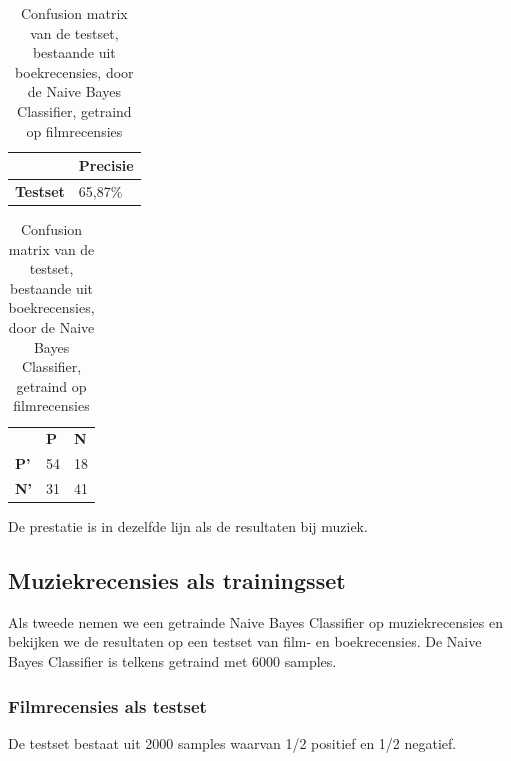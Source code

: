 \begin{table}[h]
\centering
\setlength\tabcolsep{4pt}
\begin{minipage}[t]{0.48\textwidth}
\centering
\begin{tabular}{l|l|}
\cline{2-2}
                                            & \textbf{Precisie} \\ \hline
\multicolumn{1}{|l|}{\textbf{Testset}}      & 65,87\%           \\ \hline
\end{tabular}
\caption{Classificatieprecisie Naive Bayes Classifier, getraind op filmrecensies, getest op boekrecensies}
\end{minipage}%
\hfill
\begin{minipage}[t]{0.48\textwidth}
\centering
\begin{tabular}{lll}
                                 & \textbf{P}               & \textbf{N}               \\ \cline{2-3} 
\multicolumn{1}{l|}{\textbf{P'}} & \multicolumn{1}{l|}{54} & \multicolumn{1}{l|}{18} \\ \cline{2-3} 
\multicolumn{1}{l|}{\textbf{N'}} & \multicolumn{1}{l|}{31} & \multicolumn{1}{l|}{41} \\ \cline{2-3} 
\end{tabular}
\caption{Confusion matrix van de testset, bestaande uit boekrecensies, door de  Naive Bayes Classifier, getraind op filmrecensies} 
\end{minipage}
\end{table}

De prestatie is in dezelfde lijn als de resultaten bij muziek. 

\subsection{Muziekrecensies als trainingsset}\label{Muziekrecensies als trainingsset}

Als tweede nemen we een getrainde Naive Bayes Classifier op muziekrecensies en bekijken we de resultaten op een testset van film- en boekrecensies. De Naive Bayes Classifier is telkens getraind met 6000 samples.

\subsubsection{Filmrecensies als testset}\label{Filmrecensies als testset}

De testset bestaat uit 2000 samples waarvan 1/2 positief en 1/2 negatief.\\

